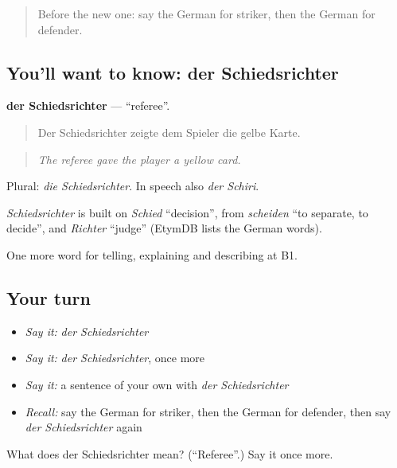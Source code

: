 \begin{quote}
Before the new one: say the German for striker, then the German for defender.
\end{quote}

\subsection*{You'll want to know: der Schiedsrichter}
\textbf{der Schiedsrichter} — \textquotedblleft{}referee\textquotedblright{}.

\begin{quote}
Der Schiedsrichter zeigte dem Spieler die gelbe Karte.
\end{quote}

\begin{quote}
\emph{The referee gave the player a yellow card.}
\end{quote}

Plural: \emph{die Schiedsrichter}. In speech also \emph{der Schiri}.

\begin{cousinweb}
\emph{Schiedsrichter} is built on \emph{Schied} \textquotedblleft{}decision\textquotedblright{}, from \emph{scheiden} \textquotedblleft{}to separate, to decide\textquotedblright{}, and \emph{Richter} \textquotedblleft{}judge\textquotedblright{} (EtymDB lists the German words).
\end{cousinweb}

\begin{grammarlens}[title={What you've built}]
One more word for telling, explaining and describing at B1.
\end{grammarlens}

\subsection*{Your turn}
\begin{itemize}
\raggedright
  \item \emph{Say it:} \emph{der Schiedsrichter}
  \item \emph{Say it:} \emph{der Schiedsrichter}, once more
  \item \emph{Say it:} a sentence of your own with \emph{der Schiedsrichter}
  \item \emph{Recall:} say the German for striker, then the German for defender, then say \emph{der Schiedsrichter} again
\end{itemize}

\begin{tcolorbox}[breakable,colback=teal!4,colframe=teal!35!black,title={Before you move on}]
What does der Schiedsrichter mean? (\textquotedblleft{}Referee\textquotedblright{}.) Say it once more.
\end{tcolorbox}
